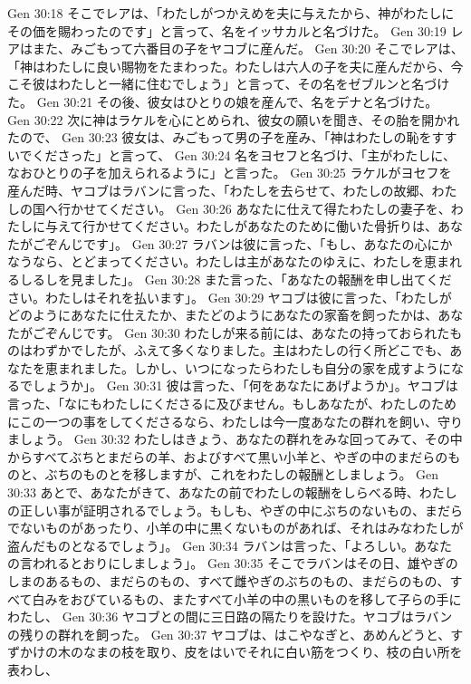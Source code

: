Gen 30:18  そこでレアは、「わたしがつかえめを夫に与えたから、神がわたしにその価を賜わったのです」と言って、名をイッサカルと名づけた。
Gen 30:19  レアはまた、みごもって六番目の子をヤコブに産んだ。
Gen 30:20  そこでレアは、「神はわたしに良い賜物をたまわった。わたしは六人の子を夫に産んだから、今こそ彼はわたしと一緒に住むでしょう」と言って、その名をゼブルンと名づけた。
Gen 30:21  その後、彼女はひとりの娘を産んで、名をデナと名づけた。
Gen 30:22  次に神はラケルを心にとめられ、彼女の願いを聞き、その胎を開かれたので、
Gen 30:23  彼女は、みごもって男の子を産み、「神はわたしの恥をすすいでくださった」と言って、
Gen 30:24  名をヨセフと名づけ、「主がわたしに、なおひとりの子を加えられるように」と言った。
Gen 30:25  ラケルがヨセフを産んだ時、ヤコブはラバンに言った、「わたしを去らせて、わたしの故郷、わたしの国へ行かせてください。
Gen 30:26  あなたに仕えて得たわたしの妻子を、わたしに与えて行かせてください。わたしがあなたのために働いた骨折りは、あなたがごぞんじです」。
Gen 30:27  ラバンは彼に言った、「もし、あなたの心にかなうなら、とどまってください。わたしは主があなたのゆえに、わたしを恵まれるしるしを見ました」。
Gen 30:28  また言った、「あなたの報酬を申し出てください。わたしはそれを払います」。
Gen 30:29  ヤコブは彼に言った、「わたしがどのようにあなたに仕えたか、またどのようにあなたの家畜を飼ったかは、あなたがごぞんじです。
Gen 30:30  わたしが来る前には、あなたの持っておられたものはわずかでしたが、ふえて多くなりました。主はわたしの行く所どこでも、あなたを恵まれました。しかし、いつになったらわたしも自分の家を成すようになるでしょうか」。
Gen 30:31  彼は言った、「何をあなたにあげようか」。ヤコブは言った、「なにもわたしにくださるに及びません。もしあなたが、わたしのためにこの一つの事をしてくださるなら、わたしは今一度あなたの群れを飼い、守りましょう。
Gen 30:32  わたしはきょう、あなたの群れをみな回ってみて、その中からすべてぶちとまだらの羊、およびすべて黒い小羊と、やぎの中のまだらのものと、ぶちのものとを移しますが、これをわたしの報酬としましょう。
Gen 30:33  あとで、あなたがきて、あなたの前でわたしの報酬をしらべる時、わたしの正しい事が証明されるでしょう。もしも、やぎの中にぶちのないもの、まだらでないものがあったり、小羊の中に黒くないものがあれば、それはみなわたしが盗んだものとなるでしょう」。
Gen 30:34  ラバンは言った、「よろしい。あなたの言われるとおりにしましょう」。
Gen 30:35  そこでラバンはその日、雄やぎのしまのあるもの、まだらのもの、すべて雌やぎのぶちのもの、まだらのもの、すべて白みをおびているもの、またすべて小羊の中の黒いものを移して子らの手にわたし、
Gen 30:36  ヤコブとの間に三日路の隔たりを設けた。ヤコブはラバンの残りの群れを飼った。
Gen 30:37  ヤコブは、はこやなぎと、あめんどうと、すずかけの木のなまの枝を取り、皮をはいでそれに白い筋をつくり、枝の白い所を表わし、
